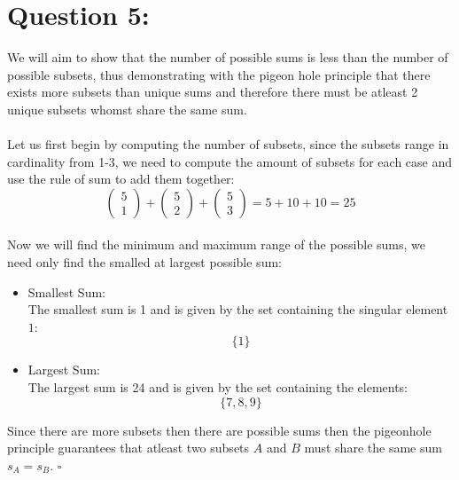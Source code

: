 \documentclass{article}
\begin{document}
\section*{Question 5:}
We will aim to show that the number of possible sums is less than the number of possible subsets, thus demonstrating with the pigeon hole principle that there exists more subsets than unique sums and therefore there must be atleast 2 unique subsets whomst share the same sum.\\\\
Let us first begin by computing the number of subsets, since the subsets range in cardinality from 1-3, we need to compute the amount of subsets for each case and use the rule of sum to add them together:
$$\begin{pmatrix}
    5\\1
\end{pmatrix}+\begin{pmatrix}
    5\\2
\end{pmatrix}+\begin{pmatrix}
    5\\3
\end{pmatrix}=5+10+10=25$$\\
Now we will find the minimum and maximum range of the possible sums, we need only find the smalled at largest possible sum:
\begin{itemize}
    \item Smallest Sum:\\The smallest sum is 1 and is given by the set containing the singular element $1$: $$\{1\}$$
    \item Largest Sum: \\The largest sum is 24 and is given by the set containing the elements: $$\{7,8,9\}$$
\end{itemize}

Since there are more subsets then there are possible sums then the pigeonhole principle guarantees that atleast two subsets $A$ and $B$ must share the same sum $s_{A}=s_{B}$. $\square$
\end{document}
